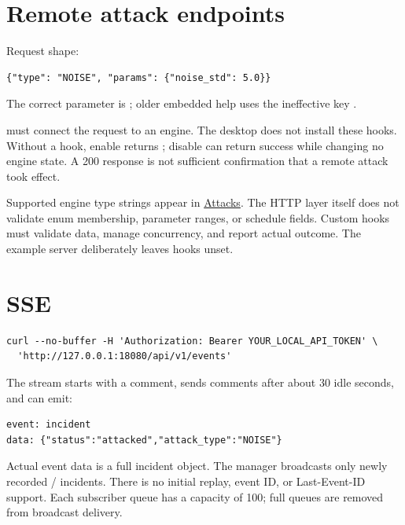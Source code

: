 \section*{Remote attack endpoints}
\par\noindent\begin{minipage}{\linewidth}
Request shape:
\begin{lstlisting}[title={JSON}]
{"type": "NOISE", "params": {"noise_std": 5.0}}
\end{lstlisting}
\end{minipage}\par
The correct parameter is ; older embedded help uses the ineffective key .

 must connect the request to an engine. The desktop does not install these hooks. Without a hook, enable returns ; disable can return success while changing no engine state. A 200 response is not sufficient confirmation that a remote attack took effect.

Supported engine type strings appear in \hyperref[chapter-6]{Attacks}. The HTTP layer itself does not validate enum membership, parameter ranges, or schedule fields. Custom hooks must validate data, manage concurrency, and report actual outcome. The example server deliberately leaves hooks unset.

\section*{SSE}
\par\noindent\begin{minipage}{\linewidth}
\begin{lstlisting}[title={BASH}]
curl --no-buffer -H 'Authorization: Bearer YOUR_LOCAL_API_TOKEN' \
  'http://127.0.0.1:18080/api/v1/events'
\end{lstlisting}
\end{minipage}\par
The stream starts with a comment, sends  comments after about 30 idle seconds, and can emit:

\par\noindent\begin{minipage}{\linewidth}
\begin{lstlisting}[title={TEXT}]
event: incident
data: {"status":"attacked","attack_type":"NOISE"}

\end{lstlisting}
\end{minipage}\par
Actual event data is a full incident object. The manager broadcasts only newly recorded / incidents. There is no initial replay, event ID, or Last-Event-ID support. Each subscriber queue has a capacity of 100; full queues are removed from broadcast delivery.

